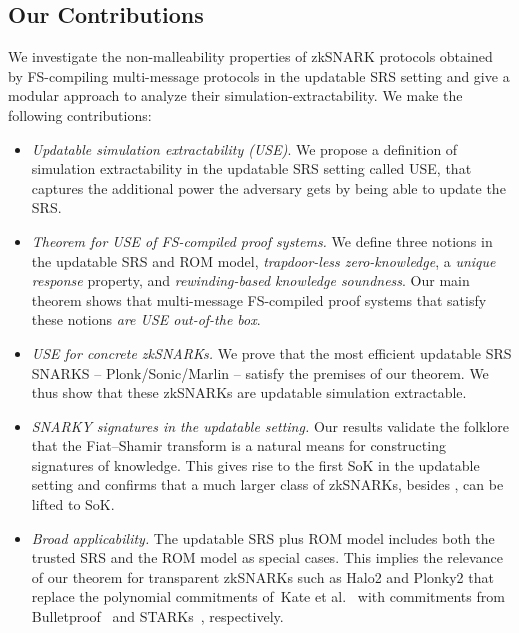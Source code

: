 \subsection{Our Contributions}
We investigate the non-malleability properties of zkSNARK protocols obtained by FS-compiling multi-message protocols in the updatable SRS setting and give a modular approach to analyze their simulation-extractability. We make the following contributions:
\begin{itemize}
\item 
\emph{Updatable simulation extractability (USE)}. 
We propose a definition of simulation extractability in the updatable SRS setting called USE, that captures the additional power the adversary gets by being able to update the SRS. 
    
  \item \emph{Theorem for USE of FS-compiled proof systems.} We
         define three notions in the updatable SRS and ROM model, 
        \emph{trapdoor-less zero-knowledge},
        a \emph{unique response} property, and \emph{rewinding-based
        knowledge soundness}. Our main theorem shows that multi-message FS-compiled proof systems that satisfy these notions \emph{are USE
        out-of-the box}. %
    
\item
\emph{USE for concrete zkSNARKs.}
We prove that the most efficient updatable SRS SNARKS -- Plonk/Sonic/Marlin -- satisfy the premises of our theorem. We thus show that these zkSNARKs are updatable simulation extractable.

\item
  \emph{SNARKY signatures in the updatable setting.} Our results validate the folklore that the Fiat--Shamir transform is a natural means for constructing signatures of knowledge. This gives rise to the first SoK in the updatable setting and confirms that a much larger class of zkSNARKs, besides \cite{C:GroMal17}, can be lifted to SoK.

\item \emph{Broad applicability.} The updatable SRS plus ROM model includes both the trusted SRS and the ROM model as special cases. This implies the relevance of our theorem for transparent zkSNARKs such as Halo2 and Plonky2 that replace the polynomial commitments of~Kate et al.~\cite{AC:KatZavGol10} with commitments from Bulletproof~\cite{SP:BBBPWM18} and STARKs~\cite{EPRINT:BBHR18}, respectively.
  
\end{itemize}


